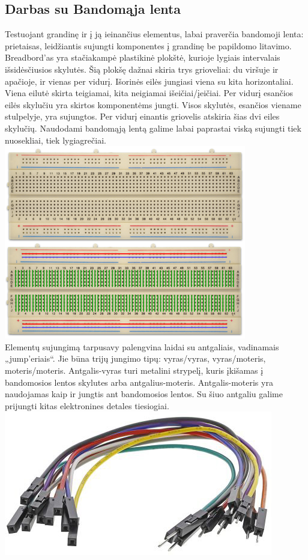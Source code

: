 \documentclass{VUMIFPSkursinis}
\begin{document}
\subsection{Darbas su Bandomąja lenta}
Testuojant grandinę ir į ją ieinančius elementus, labai praverčia bandomoji lenta: prietaisas, leidžiantis sujungti komponentes į grandinę be papildomo litavimo. Breadbord'as yra stačiakampė plastikinė plokštė, kurioje lygiais intervalais išsidėsčiusios skylutės. Šią plokšę dažnai skiria trys grioveliai: du viršuje ir apačioje, ir vienas per vidurį. Išorinės eilės jungiasi viena su kita horizontaliai. Viena eilutė skirta teigiamai, kita neigiamai išeičiai/įeičiai. Per vidurį esančios eilės skylučiu yra skirtos komponentėms jungti. Visos skylutės, esančios viename stulpelyje, yra sujungtos. Per vidurį einantis griovelis atskiria šias dvi eiles skylučių. Naudodami bandomąją lentą galime labai paprastai viską sujungti tiek nuosekliai, tiek lygiagrečiai.\\

\includegraphics{img/breadboard}\\
Elementų sujungimą tarpusavy palengvina laidai su antgaliais, vadinamais „jump'eriais“. Jie būna trijų jungimo tipų: vyras/vyras, vyras/moteris, moteris/moteris. Antgalis-vyras turi metalini strypelį, kuris įkišamas į bandomosios lentos skylutes arba antgalius-moteris. Antgalis-moteris yra naudojamas kaip ir jungtis ant bandomosios lentos. Su šiuo antgaliu galime prijungti kitas elektronines detales tiesiogiai.\\
\includegraphics[scale=3]{img/jumperwire}\\
\end{document}
